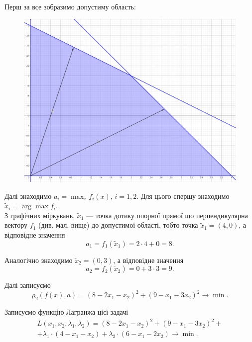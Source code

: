\begin{solution}
    Перш за все зобразимо допустиму область:
    \begin{figure}[H]
        \centering
        \includegraphics[width=\textwidth]{img/ideal_point_2.png}
    \end{figure}
    
    Далі знаходимо $a_i = \max_x f_i(x)$, $i = 1, 2$. Для цього спершу знаходимо $\tilde x_i = \arg \max f_i$. \\
    
    З графічних міркувань, $\tilde x_1$ --- точка дотику опорної прямої що перпендикулярна вектору $f_1$ (див. мал. вище) до допустимої області, тобто точка $\tilde x_1 = \left( 4, 0 \right)$, а відповідне значення \[ a_1 = f_1(\tilde x_1) = 2 \cdot 4 + 0 = 8. \]
    
    Аналогічно знаходимо $\tilde x_2 = \left( 0, 3 \right)$, а відповідне значення \[ a_2 = f_2(\tilde x_2) = 0 + 3 \cdot 3 = 9. \]
    
    Далі записуємо \[ \rho_2(f(x), a) = \left( 8 - 2 x_1 - x_2 \right)^2 + \left( 9 - x_1 - 3 x_2 \right)^2 \to \min. \]
    
    Записуємо функцію Лагранжа цієї задачі 
    \begin{multline*} 
        L(x_1, x_2, \lambda_1, \lambda_2) = \left( 8 - 2 x_1 - x_2 \right)^2 + \left( 9 - x_1 - 3 x_2 \right)^2 + \\ 
        + \lambda_1 \cdot (4 - x_1 - x_2) + \lambda_2 \cdot (6 - x_1 - 2 x_2) \to \min.
    \end{multline*}
    

\end{solution}
